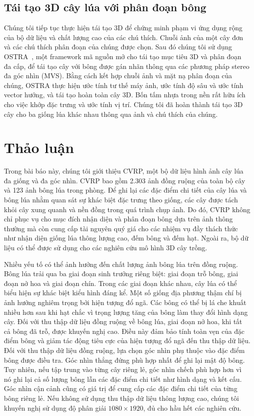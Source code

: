 \documentclass[12pt, a4paper]{article}
\begin{document}
\subsection{Tái tạo 3D cây lúa với phân đoạn bông}

Chúng tôi tiếp tục thực hiện tái tạo 3D để chứng minh phạm vi ứng dụng rộng của bộ dữ liệu
và chất lượng cao của các chú thích. Chuỗi ảnh của một cây đơn và các chú thích phân đoạn
của chúng được chọn. Sau đó chúng tôi sử dụng OSTRA~\cite{xu2023}, một framework mã nguồn
mở cho tái tạo mục tiêu 3D và phân đoạn đa cấp, để tái tạo cây với bông được gán nhãn thông
qua các phương pháp stereo đa góc nhìn (MVS). Bằng cách kết hợp chuỗi ảnh và mặt nạ phân
đoạn của chúng, OSTRA thực hiện ước tính tư thế máy ảnh, ước tính độ sâu và ước tính vector
hướng, và tái tạo hoàn toàn cây 3D. Bốn tấm nhựa trong nền rất hữu ích cho việc khớp đặc
trưng và ước tính vị trí. Chúng tôi đã hoàn thành tái tạo 3D cây cho ba giống lúa khác nhau
thông qua ảnh và chú thích của chúng.

\section{Thảo luận}

Trong bài báo này, chúng tôi giới thiệu CVRP, một bộ dữ liệu hình ảnh cây lúa đa giống và
đa góc nhìn. CVRP bao gồm 2.303 ảnh đồng ruộng của toàn bộ cây và 123 ảnh bông lúa trong
phòng. Để ghi lại các đặc điểm chi tiết của cây lúa và bông lúa nhằm quan sát sự khác biệt
đặc trưng theo giống, các cây được tách khỏi cây xung quanh và nền đồng trong quá trình chụp
ảnh. Do đó, CVRP không chỉ phục vụ cho mục đích nhận diện và phân đoạn bông dựa trên ảnh
thông thường mà còn cung cấp tài nguyên quý giá cho các nhiệm vụ đầy thách thức như nhận diện
giống lúa thông lượng cao, đếm bông và đếm hạt. Ngoài ra, bộ dữ liệu có thể được sử dụng cho
các nghiên cứu mô hình 3D cây trồng.

Nhiều yếu tố có thể ảnh hưởng đến chất lượng ảnh bông lúa trên đồng ruộng. Bông lúa trải qua
ba giai đoạn sinh trưởng riêng biệt: giai đoạn trỗ bông, giai đoạn nở hoa và giai đoạn chín.
Trong các giai đoạn khác nhau, cây lúa có thể biểu hiện sự khác biệt kiểu hình đáng kể. Một
số giống địa phương thậm chí bị ảnh hưởng nghiêm trọng bởi hiện tượng đổ ngã. Các bông có
thể bị lá che khuất nhiều hơn sau khi hạt chắc vì trọng lượng tăng của bông làm thay đổi
hình dạng cây. Đối với thu thập dữ liệu đồng ruộng về bông lúa, giai đoạn nở hoa, khi tất
cả bông đã trỗ, được khuyến nghị cao. Điều này đảm bảo tính toàn vẹn của đặc điểm bông và
giảm tác động tiêu cực của hiện tượng đổ ngã đến thu thập dữ liệu. Đối với thu thập dữ liệu
đồng ruộng, lựa chọn góc nhìn phụ thuộc vào đặc điểm bông được điều tra. Góc nhìn thẳng đứng
phù hợp nhất để ghi lại mật độ bông. Tuy nhiên, nếu tập trung vào từng cây riêng lẻ, góc
nhìn chếch phù hợp hơn vì nó ghi lại cả số lượng bông lẫn các đặc điểm chi tiết như hình
dạng và kết cấu. Góc nhìn cận cảnh cũng có giá trị để cung cấp các đặc điểm chi tiết của
từng bông riêng lẻ. Nếu không sử dụng thu thập dữ liệu thông lượng cao, chúng tôi khuyến
nghị sử dụng độ phân giải $1080 \times 1920$, đủ cho hầu hết các nghiên cứu.
\end{document}
